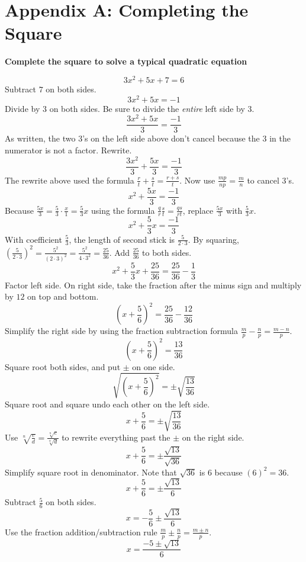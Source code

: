 \documentclass[twoside]{tufte-handout}
\newcommand{\booksection}{0}
\newcommand{\pageheader}{}
\theoremstyle{ekimcustom}
\begin{document}
\renewcommand{\booksection}{Appendix A: Completing the Square}
\renewcommand{\pageheader}{\booksection }
\section*{\LARGE \pageheader}

{\bf Complete the square to solve a typical quadratic equation}\label{cts-example}
\begin{center}
\[3x^2+5x+7=6\]
Subtract $7$ on both sides.
\[3x^2+5x=-1\]
Divide by $3$ on both sides. Be sure to divide the \emph{entire} left side by $3$.
\[\frac{3x^2+5x}{3}=\frac{-1}{3}\]
As written, the two $3$'s on the left side above don't cancel because the $3$ in the numerator is not a factor. Rewrite.
\[\frac{3x^2}{3}+\frac{5x}{3}=\frac{-1}{3}\]
The rewrite above used the formula $\frac{r}{t}+\frac{s}{t}=\frac{r+s}{t}$. Now use $\frac{mp}{np}=\frac{m}{n}$ to cancel $3$'s.
\[x^2+\frac{5x}{3}=\frac{-1}{3}\]
Because $\frac{5x}{3}=\frac{5}{3}\cdot\frac{x}{1}=\frac{5}{3}x$ using the formula $\frac{q}{r}\frac{s}{t}=\frac{qs}{rt}$, replace $\frac{5x}{3}$ with $\frac{5}{3}x$.
\[x^2+\frac{5}{3}x=\frac{-1}{3}\]
With coefficient $\frac{5}{3}$, the length of second stick is $\frac{5}{2 \cdot 3}$. By squaring, $(\frac{5}{2 \cdot 3})^2=\frac{5^2}{(2 \cdot 3)^2}=\frac{5^2}{4 \cdot 3^2}=\frac{25}{36}$. Add $\frac{25}{36}$ to both sides.
\[x^2+\frac{5}{3}x+\frac{25}{36}=\frac{25}{36}-\frac{1}{3}\]
Factor left side. On right side, take the fraction after the minus sign and multiply by $12$ on top and bottom.
\[\left(x+\frac{5}{6}\right)^2=\frac{25}{36}-\frac{12}{36}\]
Simplify the right side by using the fraction subtraction formula $\frac{m}{p}-\frac{n}{p}=\frac{m-n}{p}$.
\[\left(x+\frac{5}{6}\right)^2=\frac{13}{36}\]
Square root both sides, and put $\pm$ on one side. %
\[\sqrt{\left(x+\frac{5}{6}\right)^2}=\pm \sqrt{\frac{13}{36}}\]
Square root and square undo each other on the left side.
\[x+\frac{5}{6}=\pm\sqrt{\frac{13}{36}}\]
Use $\sqrt[n]{\frac{c}{d}}=\frac{\sqrt[n]{c}}{\sqrt[n]{d}}$ to rewrite everything past the $\pm$ on the right side.
\[x+\frac{5}{6}=\pm\frac{\sqrt{13}}{\sqrt{36}}\]
Simplify square root in denominator. Note that $\sqrt{36}$ is $6$ because $(6)^2=36$.
\[x+\frac{5}{6}=\pm\frac{\sqrt{13}}{6}\]
Subtract $\frac{5}{6}$ on both sides.
\[x=-\frac{5}{6}\pm\frac{\sqrt{13}}{6}\]
Use the fraction addition/subtraction rule $\frac{m}{p} \pm \frac{n}{p}=\frac{m \pm n}{p}$.
\[x=\frac{-5 \pm \sqrt{13}}{6}\]
\end{center}
\end{document}
